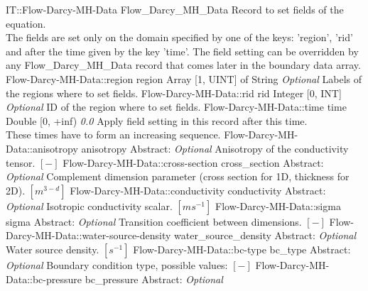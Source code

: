 \begin{RecordType}
	{IT::Flow-Darcy-MH-Data}
	{Flow{\_}Darcy{\_}MH{\_}Data}
	{} %
	{} %
	{{{Record to set fields of the equation.}\\{
The fields are set only on the domain specified by one of the keys: 'region', 'rid'}\\{
and after the time given by the key 'time'. The field setting can be overridden by}\\{
 any Flow{\_}Darcy{\_}MH{\_}Data record that comes later in the boundary data array.}}}
		\RecKey
			{Flow-Darcy-MH-Data::region}
			{region}
			{{Array [1, UINT] of }{String}}
			{ \it{Optional} }
			{{{Labels of the regions where to set fields. }}}
		\RecKey
			{Flow-Darcy-MH-Data::rid}
			{rid}
			{{Integer [0, INT]}}
			{ \it{Optional} }
			{{{ID of the region where to set fields.}}}
		\RecKey
			{Flow-Darcy-MH-Data::time}
			{time}
			{{Double [0, +inf)}}
			{ \it{0.0} }
			{{{Apply field setting in this record after this time.}\\{
These times have to form an increasing sequence.}}}
		\RecKey
			{Flow-Darcy-MH-Data::anisotropy}
			{anisotropy}
			{{Abstract}{: }}
			{ \it{Optional} }
			{{{Anisotropy of the conductivity tensor. }{$[-]$}}}
		\RecKey
			{Flow-Darcy-MH-Data::cross-section}
			{cross{\_}section}
			{{Abstract}{: }}
			{ \it{Optional} }
			{{{Complement dimension parameter (cross section for 1D, thickness for 2D). }{$[m^{3-d}]$}}}
		\RecKey
			{Flow-Darcy-MH-Data::conductivity}
			{conductivity}
			{{Abstract}{: }}
			{ \it{Optional} }
			{{{Isotropic conductivity scalar. }{$[ms^{-1}]$}}}
		\RecKey
			{Flow-Darcy-MH-Data::sigma}
			{sigma}
			{{Abstract}{: }}
			{ \it{Optional} }
			{{{Transition coefficient between dimensions. }{$[-]$}}}
		\RecKey
			{Flow-Darcy-MH-Data::water-source-density}
			{water{\_}source{\_}density}
			{{Abstract}{: }}
			{ \it{Optional} }
			{{{Water source density. }{$[s^{-1}]$}}}
		\RecKey
			{Flow-Darcy-MH-Data::bc-type}
			{bc{\_}type}
			{{Abstract}{: }}
			{ \it{Optional} }
			{{{Boundary condition type, possible values: }{$[-]$}}}
		\RecKey
			{Flow-Darcy-MH-Data::bc-pressure}
			{bc{\_}pressure}
			{{Abstract}{: }}
			{ \it{Optional} }

\end{RecordType}
